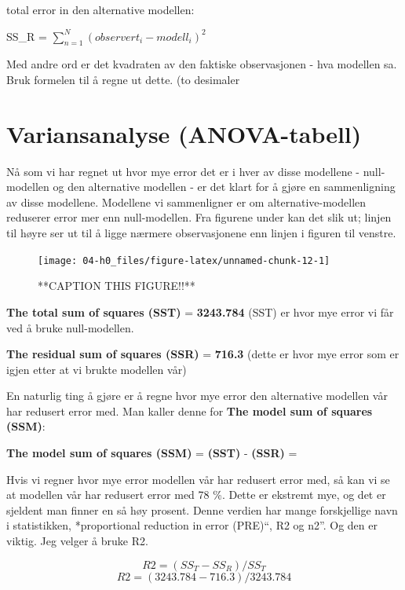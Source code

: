 \documentclass[
]{book}
\begin{document}
total error in den alternative modellen:

SS\_R = \(\sum_{n=1}^N (observert_i - modell_i)^2\)

Med andre ord er det kvadraten av den faktiske observasjonen - hva modellen sa. Bruk formelen til å regne ut dette. (to desimaler

\hypertarget{variansanalyse-anova-tabell}{%
\section{Variansanalyse (ANOVA-tabell)}\label{variansanalyse-anova-tabell}}

Nå som vi har regnet ut hvor mye error det er i hver av disse modellene - null-modellen og den alternative modellen - er det klart for å gjøre en sammenligning av disse modellene. Modellene vi sammenligner er om alternative-modellen reduserer error mer enn null-modellen. Fra figurene under kan det slik ut; linjen til høyre ser ut til å ligge nærmere observasjonene enn linjen i figuren til venstre.

\begin{figure}

{\centering \texttt{[image: 04-h0\_files/figure-latex/unnamed-chunk-12-1]} 

}

\caption{**CAPTION THIS FIGURE!!**}\label{fig:unnamed-chunk-12}
\end{figure}

\textbf{The total sum of squares (SST)} = \textbf{3243.784}
(SST) er hvor mye error vi får ved å bruke null-modellen.

\textbf{The residual sum of squares (SSR)} = \textbf{716.3}
(dette er hvor mye error som er igjen etter at vi brukte modellen vår)

En naturlig ting å gjøre er å regne hvor mye error den alternative modellen vår har redusert error med. Man kaller denne for \textbf{The model sum of squares (SSM)}:

\textbf{The model sum of squares (SSM)} = \textbf{(SST)} - \textbf{(SSR)} =

Hvis vi regner hvor mye error modellen vår har redusert error med, så kan vi se at modellen vår har redusert error med 78 \%. Dette er ekstremt mye, og det er sjeldent man finner en så høy prosent. Denne verdien har mange forskjellige navn i statistikken, *proportional reduction in error (PRE)``, R2 og n2''. Og den er viktig. Jeg velger å bruke R2.

\[
R2 = (SS_T - SS_R) / SS_T
\]
\[
R2 = (3243.784 - 716.3) / 3243.784 
\]
\end{document}

